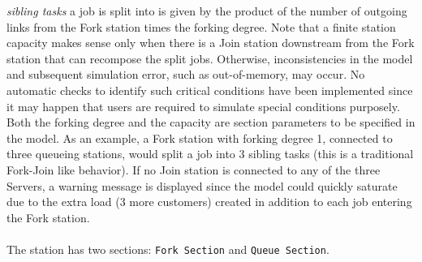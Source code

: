 \emph{sibling tasks} a job is split into is given by the product
of the number of outgoing links from the Fork station times the
forking degree. Note that a finite station capacity makes sense
only when there is a Join station downstream from the Fork station
that can recompose the split jobs. Otherwise, inconsistencies in
the model and subsequent simulation error, such as out-of-memory,
may occur. No automatic checks to identify such critical
conditions have been implemented since it may happen that users
are required to simulate special conditions purposely. Both the
forking degree and the capacity are section parameters to be
specified in the model. As an example, a Fork station with forking
degree 1, connected to three queueing stations, would split a job
into 3 sibling tasks (this is a traditional Fork-Join like
behavior). If no Join station is connected to any of the three
Servers, a warning message is displayed since the model could
quickly saturate due to the extra load (3 more customers) created
in addition to each job entering
the Fork station.\\

\\
 The station has two
sections: \texttt{Fork Section} and \texttt{Queue Section}.

